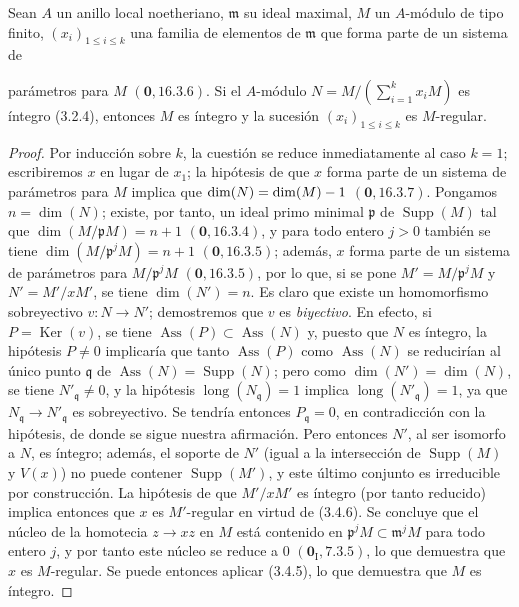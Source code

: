 \begin{corollary}[3.4.7]
\label{IV.2.3.4.7-fr}
Sean $A$ un anillo local noetheriano, $\mathfrak m$ su ideal maximal, $M$ un
$A$-módulo de tipo finito, $(x_i)_{1\leqslant i\leqslant k}$ una familia de
elementos de $\mathfrak m$ que forma parte de un sistema de


parámetros para $M$ $(\mathbf{0},16.3.6)$. Si el $A$-módulo
$N=M/(\sum_{i=1}^k x_iM)$
es íntegro \textup{(3.2.4)}, entonces $M$ es íntegro y la sucesión
$(x_i)_{1\leqslant i\leqslant k}$ es $M$-regular.
\end{corollary}

\begin{proof}
Por inducción sobre $k$, la cuestión se reduce inmediatamente al caso $k=1$; escribiremos
$x$ en lugar de $x_1$; la hipótesis de que $x$ forma parte de un sistema de
parámetros para $M$ implica que
$\dim(N)=\dim(M)- 1$ $(\mathbf{0},16.3.7)$. Pongamos $n=\dim(N)$; existe, por tanto,
un ideal primo minimal $\mathfrak p$ de $\operatorname{Supp}(M)$ tal que
$\dim(M/\mathfrak pM)=n+1$ $(\mathbf{0},16.3.4)$, y para todo entero $j>0$ también se
tiene $\dim(M/\mathfrak p^jM)=n+1$ $(\mathbf{0},16.3.5)$; además, $x$ forma parte de
un sistema de parámetros para $M/\mathfrak p^jM$ $(\mathbf{0},16.3.5)$, por lo que,
si se pone $M'=M/\mathfrak p^jM$ y $N'=M'/xM'$, se tiene $\dim(N')=n$. Es
claro que existe un homomorfismo sobreyectivo $v:N\to N'$; demostremos que
$v$ es \emph{biyectivo}. En efecto, si $P=\operatorname{Ker}(v)$, se tiene
$\operatorname{Ass}(P)\subset\operatorname{Ass}(N)$ y, puesto que $N$ es
íntegro, la hipótesis $P\neq0$ implicaría que tanto $\operatorname{Ass}(P)$
como $\operatorname{Ass}(N)$ se reducirían al único punto
$\mathfrak q$ de $\operatorname{Ass}(N)=\operatorname{Supp}(N)$; pero como
$\dim(N')=\dim(N)$, se tiene $N'_{\mathfrak q}\neq0$, y la hipótesis
$\operatorname{long}(N_{\mathfrak q})=1$ implica
$\operatorname{long}(N'_{\mathfrak q})=1$, ya que
$N_{\mathfrak q}\to N'_{\mathfrak q}$ es sobreyectivo. Se tendría entonces
$P_{\mathfrak q}=0$, en contradicción con la hipótesis, de donde se sigue
nuestra afirmación. Pero entonces $N'$, al ser isomorfo a $N$, es íntegro;
además, el soporte de $N'$ (igual a la intersección de
$\operatorname{Supp}(M)$ y $V(x)$) no puede contener
$\operatorname{Supp}(M')$, y este último conjunto es irreducible por
construcción. La hipótesis de que $M'/xM'$ es íntegro (por tanto reducido)
implica entonces que $x$ es $M'$-regular en virtud de (3.4.6). Se concluye
que el núcleo de la homotecia $z\to xz$ en $M$ está contenido en
$\mathfrak p^jM\subset\mathfrak m^jM$ para todo entero $j$, y por tanto este
núcleo se reduce a $0$ $(\mathbf{0}_{\mathrm I},7.3.5)$, lo que demuestra que $x$ es
$M$-regular. Se puede entonces aplicar (3.4.5), lo que demuestra que $M$ es
íntegro.
\end{proof}

